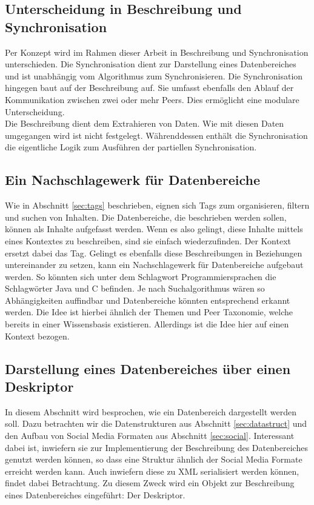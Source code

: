 \documentclass[a4paper]{article}
\begin{document}
	\subsection{Unterscheidung in Beschreibung und Synchronisation}
	
	Per Konzept wird im Rahmen dieser Arbeit in Beschreibung und Synchronisation
	unterschieden. Die Synchronisation dient zur Darstellung eines Datenbereiches
	und ist unabhängig vom Algorithmus zum Synchronisieren. Die Synchronisation
	hingegen baut auf der Beschreibung auf. Sie  umfasst ebenfalls den Ablauf
	der Kommunikation zwischen zwei oder mehr Peers. Dies ermöglicht eine modulare
	Unterscheidung. \\
	
	Die Beschreibung dient dem Extrahieren von Daten. Wie mit diesen
	Daten umgegangen wird ist nicht festgelegt. Währenddessen enthält die
	Synchronisation die eigentliche Logik zum Ausführen der partiellen
	Synchronisation. 	
	
	\subsection{Ein Nachschlagewerk für Datenbereiche}
	
	Wie in Abschnitt \ref{sec:tags} beschrieben, eignen sich Tags zum organisieren,
	filtern und suchen von Inhalten. Die Datenbereiche, die beschrieben werden
	sollen, können als Inhalte aufgefasst werden. Wenn es also gelingt, diese Inhalte
	mittels eines Kontextes zu beschreiben, sind sie einfach wiederzufinden.
	Der Kontext ersetzt dabei das Tag. Gelingt es ebenfalls diese Beschreibungen in
	Beziehungen untereinander zu setzen, kann ein Nachschlagewerk für
	Datenbereiche aufgebaut werden. So könnten sich unter dem Schlagwort
	Programmiersprachen die Schlagwörter Java und C befinden. 
	Je nach Suchalgorithmus wären so Abhängigkeiten auffindbar
	und Datenbereiche könnten entsprechend erkannt werden. Die Idee ist hierbei
	ähnlich der Themen und Peer Taxonomie, welche bereits in einer Wissensbasis
	existieren. Allerdings ist die Idee hier auf einen Kontext bezogen.
	
	\subsection{Darstellung eines Datenbereiches über einen Deskriptor}
	
	In diesem Abschnitt wird besprochen, wie ein Datenbereich dargestellt werden
	soll. Dazu betrachten wir die Datenstrukturen aus Abschnitt
	\ref{sec:datastruct} und den Aufbau von Social Media Formaten aus Abschnitt
	\ref{sec:social}. Interessant dabei ist, inwiefern sie zur Implementierung der
	Beschreibung des Datenbereiches genutzt werden können, so dass eine Struktur
	ähnlich der Social Media Formate erreicht werden kann. Auch inwiefern
	diese zu XML serialisiert werden können, findet dabei Betrachtung. Zu diesem
	Zweck wird ein Objekt zur Beschreibung eines Datenbereiches eingeführt: Der
	Deskriptor. 
	
\end{document}
